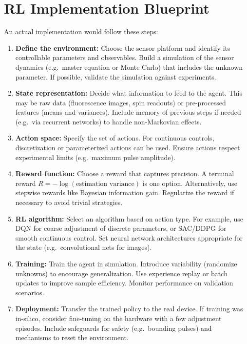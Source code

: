 \documentclass[
    aps,
    prx,
    reprint,
    superscriptaddress,
    amsmath,
    amssymb,
    longbibliography
]{revtex4-2}
\begin{document}
\section{RL Implementation Blueprint}
An actual implementation would follow these steps:
\begin{enumerate}
  \item {\bf Define the environment:} Choose the sensor platform and identify its controllable parameters and observables.  Build a simulation of the sensor dynamics (e.g.\ master equation or Monte Carlo) that includes the unknown parameter. If possible, validate the simulation against experiments.
  \item {\bf State representation:} Decide what information to feed to the agent.  This may be raw data (fluorescence images, spin readouts) or pre-processed features (means and variances). Include memory of previous steps if needed (e.g.\ via recurrent networks) to handle non-Markovian effects.
  \item {\bf Action space:} Specify the set of actions.  For continuous controls, discretization or parameterized actions can be used.  Ensure actions respect experimental limits (e.g.\ maximum pulse amplitude). 
  \item {\bf Reward function:} Choose a reward that captures precision.  A terminal reward $R = -\log(\text{estimation variance})$ is one option.  Alternatively, use stepwise rewards like Bayesian information gain.  Regularize the reward if necessary to avoid trivial strategies.
  \item {\bf RL algorithm:} Select an algorithm based on action type.  For example, use DQN for coarse adjustment of discrete parameters, or SAC/DDPG for smooth continuous control.  Set neural network architectures appropriate for the state (e.g.\ convolutional nets for images).
  \item {\bf Training:} Train the agent in simulation.  Introduce variability (randomize unknowns) to encourage generalization.  Use experience replay or batch updates to improve sample efficiency.  Monitor performance on validation scenarios.
  \item {\bf Deployment:} Transfer the trained policy to the real device.  If training was in-silico, consider fine-tuning on the hardware with a few adjustment episodes.  Include safeguards for safety (e.g.\ bounding pulses) and mechanisms to reset the environment.
\end{enumerate}
\end{document}

